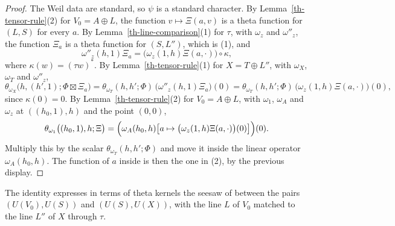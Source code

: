 \begin{proof}
The Weil data are standard, so $\psi$ is a standard character. By
Lemma~\ref{th-tensor-rule}(2) for $V_0=A\oplus L$, the function
$v\mapsto\Xi(a,v)$ is a theta function for $(L,S)$ for every $a$. By
Lemma~\ref{th-line-comparison}(1) for $\tau$, with $\omega_z$ and
$\omega''_z$, the function $\Xi_a$ is a theta function for $(S,L'')$, which is
(1), and
\[
\omega''_z(h,1)\Xi_a=\bigl(\omega_z(1,h)\Xi(a,\cdot)\bigr)\circ\kappa ,
\]
where $\kappa(w)=(\tau w)^*$. By Lemma~\ref{th-tensor-rule}(1) for
$X=T\oplus L''$, with $\omega_X$, $\omega_T$ and $\omega''_z$,
\[
\theta_{\omega_X}\bigl(h,(h',1);\Phi\boxtimes\Xi_a\bigr)
=\theta_{\omega_T}(h,h';\Phi)\,\bigl(\omega''_z(h,1)\Xi_a\bigr)(0)
=\theta_{\omega_T}(h,h';\Phi)\,\bigl(\omega_z(1,h)\Xi(a,\cdot)\bigr)(0),
\]
since $\kappa(0)=0$. By Lemma~\ref{th-tensor-rule}(2) for $V_0=A\oplus L$,
with $\omega_1$, $\omega_A$ and $\omega_z$ at $((h_0,1),h)$ and the point
$(0,0)$,
\[
\theta_{\omega_1}\bigl((h_0,1),h;\Xi\bigr)
=\Bigl(\omega_A(h_0,h)\bigl[a\mapsto\bigl(\omega_z(1,h)\Xi(a,\cdot)\bigr)(0)\bigr]\Bigr)(0).
\]
Multiply this by the scalar $\theta_{\omega_T}(h,h';\Phi)$ and move it inside
the linear operator $\omega_A(h_0,h)$. The function of $a$ inside is then the
one in (2), by the previous display.
\end{proof}

The identity expresses in terms of theta kernels the seesaw of
\cite{Kud84} between the pairs $(U(V_0),U(S))$ and $(U(S),U(X))$, with the
line $L$ of $V_0$ matched to the line $L''$ of $X$ through $\tau$.

